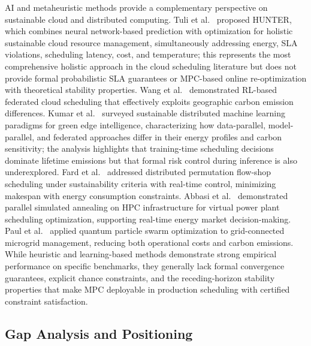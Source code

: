 \documentclass[a4paper,fleqn]{cas-dc}
\begin{document}
AI and metaheuristic methods provide a complementary perspective on sustainable cloud and distributed computing. Tuli et al.~\cite{ref-tuli21} proposed HUNTER, which combines neural network-based prediction with optimization for holistic sustainable cloud resource management, simultaneously addressing energy, SLA violations, scheduling latency, cost, and temperature; this represents the most comprehensive holistic approach in the cloud scheduling literature but does not provide formal probabilistic SLA guarantees or MPC-based online re-optimization with theoretical stability properties. Wang et al.~\cite{ref-wang23-rl} demonstrated RL-based federated cloud scheduling that effectively exploits geographic carbon emission differences. Kumar et al.~\cite{ref-kumar25} surveyed sustainable distributed machine learning paradigms for green edge intelligence, characterizing how data-parallel, model-parallel, and federated approaches differ in their energy profiles and carbon sensitivity; the analysis highlights that training-time scheduling decisions dominate lifetime emissions but that formal risk control during inference is also underexplored. Fard et al.~\cite{ref-fard24} addressed distributed permutation flow-shop scheduling under sustainability criteria with real-time control, minimizing makespan with energy consumption constraints. Abbasi et al.~\cite{ref-abbasi25} demonstrated parallel simulated annealing on HPC infrastructure for virtual power plant scheduling optimization, supporting real-time energy market decision-making. Paul et al.~\cite{ref-paul25} applied quantum particle swarm optimization to grid-connected microgrid management, reducing both operational costs and carbon emissions. While heuristic and learning-based methods demonstrate strong empirical performance on specific benchmarks, they generally lack formal convergence guarantees, explicit chance constraints, and the receding-horizon stability properties that make MPC deployable in production scheduling with certified constraint satisfaction.

\subsection{Gap Analysis and Positioning}
\label{sec:gap}
\end{document}
